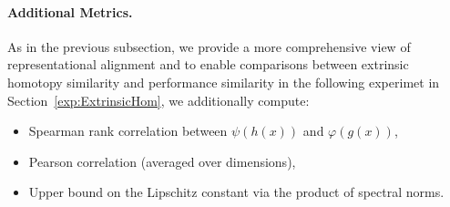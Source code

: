 \paragraph{Additional Metrics.}
As in the previous subsection, we provide a more comprehensive view of representational alignment and to enable comparisons between extrinsic homotopy similarity and performance similarity in the following experimet in Section~\ref{exp:ExtrinsicHom}, we additionally compute:
\begin{itemize}
    \item Spearman rank correlation between \( \psi(h(x)) \) and \( \varphi(g(x)) \),
    \item Pearson correlation (averaged over dimensions),
    \item Upper bound on the Lipschitz constant via the product of spectral norms.
\end{itemize}

